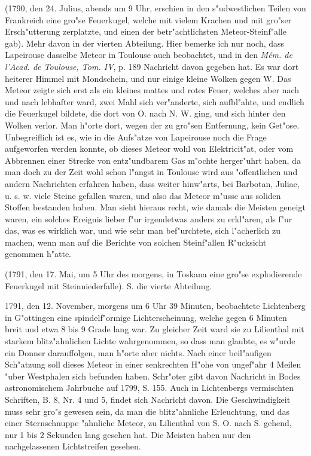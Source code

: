 \documentclass[a4paper, 11pt, oneside, polutonikogreek, german]{article}
\begin{document}
(1790, den 24. Julius, abends um 9 Uhr, erschien in den s"udwestlichen Teilen von Frankreich eine gro"se Feuerkugel, welche mit vielem Krachen und mit gro"ser Ersch"utterung zerplatzte, und einen der betr"achtlichsten Meteor-Steinf"alle gab). Mehr davon in der vierten Abteilung. Hier bemerke ich nur noch, dass Lapeirouse dasselbe Meteor in Toulouse auch beobachtet, und in den \emph{Mém. de l'Acad. de Toulouse, Tom. IV}, p. 189 Nachricht davon gegeben hat. Es war dort heiterer Himmel mit Mondschein, und nur einige kleine Wolken gegen W. Das Meteor zeigte sich erst als ein kleines mattes und rotes Feuer, welches aber nach und nach lebhafter ward, zwei Mahl sich ver"anderte, sich aufbl"ahte, und endlich die Feuerkugel bildete, die dort von O. nach N. W. ging, und sich hinter den Wolken verlor. Man h"orte dort, wegen der zu gro"sen Entfernung, kein Get"ose. Unbegreiflich ist es, wie in die Aufs"atze von Lapeirouse noch die Frage aufgeworfen werden konnte, ob dieses Meteor wohl von Elektricit"at, oder vom Abbrennen einer Strecke von entz"undbarem Gas m"ochte herger"uhrt haben, da man doch zu der Zeit wohl schon l"angst in Toulouse wird aus "offentlichen und andern Nachrichten erfahren haben, dass weiter hinw"arts, bei Barbotan, Juliac, u. s. w. viele Steine gefallen waren, und also das Meteor m"usse aus soliden Stoffen bestanden haben. Man sieht hieraus recht, wie damals die Meisten geneigt waren, ein solches Ereignis lieber f"ur irgendetwas anders zu erkl"aren, als f"ur das, was es wirklich war, und wie sehr man bef"urchtete, sich l"acherlich zu machen, wenn man auf die Berichte von solchen Steinf"allen R"ucksicht genommen h"atte.

(1791, den 17. Mai, um 5 Uhr des morgens, in Toskana eine gro"se explodierende Feuerkugel mit Steinniederfalle). S. die vierte Abteilung.

1791, den 12. November, morgens um 6 Uhr 39 Minuten, beobachtete Lichtenberg in G"ottingen eine spindelf"ormige Lichterscheinung, welche gegen 6 Minuten breit und etwa 8 bis 9 Grade lang war. Zu gleicher Zeit ward sie zu Lilienthal mit starkem blitz"ahnlichen Lichte wahrgenommen, so dass man glaubte, es w"urde ein Donner darauffolgen, man h"orte aber nichts. Nach einer beil"aufigen Sch"atzung soll dieses Meteor in einer senkrechten H"ohe von ungef"ahr 4 Meilen "uber Westphalen sich befunden haben. Schr"oter gibt davon Nachricht in Bodes astronomischem Jahrbuche auf 1799, S. 155. Auch in Lichtenbergs vermischten Schriften, B. 8, Nr. 4 und 5, findet sich Nachricht davon. Die Geschwindigkeit muss sehr gro"s gewesen sein, da man die blitz"ahnliche Erleuchtung, und das einer Sternschnuppe "ahnliche Meteor, zu Lilienthal von S. O. nach S. gehend, nur 1 bis 2 Sekunden lang gesehen hat. Die Meisten haben nur den nachgelassenen Lichtstreifen gesehen.
\end{document}
